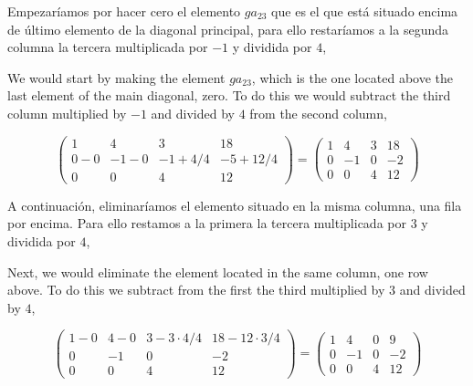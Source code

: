 \begin{paracol}{2}
\switchcolumn

Empezaríamos por hacer cero el elemento $ga_{23}$ que es el que está situado encima de último elemento de la diagonal principal, para ello restaríamos a la segunda columna la tercera multiplicada por $-1$ y dividida por $4$,

\switchcolumn


We would start by making the element $ga_{23}$, which is the one located above the last element of the main diagonal, zero. To do this we would subtract the third column multiplied by $-1$ and divided by $4$ from the second column,

\end{paracol}

\begin{equation*}
\begin{pmatrix}
1&     4&     3&    18\\
 0-0&    -1-0&    -1+4/4&    -5+12/4\\
 0&     0&     4&    12
\end{pmatrix}=\begin{pmatrix}
1&     4&     3&    18\\
 0&    -1&    0&    -2\\
 0&     0&     4&    12
 \end{pmatrix}
\end{equation*}  

\begin{paracol}{2}

A continuación, eliminaríamos el elemento situado en la misma columna, una fila por encima. Para ello restamos a la primera la tercera multiplicada por $3$ y dividida por $4$,

\switchcolumn

Next, we would eliminate the element located in the same column, one row above. To do this we subtract from the first the third multiplied by $3$ and divided by $4$,

\end{paracol}

\begin{equation*}
\begin{pmatrix}
1-0&     4-0&     3-3\cdot 4/4&    18-12\cdot 3/4\\
 0&    -1&    0&    -2\\
 0&     0&     4&    12
\end{pmatrix}=\begin{pmatrix}
1&     4&     0&    9\\
 0&    -1&    0&    -2\\
 0&     0&     4&    12
\end{pmatrix}
\end{equation*}

